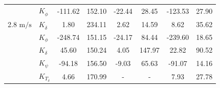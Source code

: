 \begin{table}[]
\begin{tabular}{llcccccc}
                                                   & $K_{\dot{\phi}} $                                      & -111.62                                     & 152.10                                               & -22.44                                      & 28.45                                                & -123.53                                     & 27.90                                                \\
    \multirow{-2}{*}{2.8 $\si{\meter\per\second}$} & $K_{\dot{\delta}}$                                     & 1.80                                        & 234.11                                               & 2.62                                        & 14.59                                                & 8.62                                        & 35.62                                                \\
                                                   & $K_{\phi} $                                            & -248.74                                     & 151.15                                               & -24.17                                      & 84.44                                                & -239.60                                     & 18.65                                                \\
                                                   & $K_\delta $                                            & 45.60                                       & 150.24                                               & 4.05                                        & 147.97                                               & 22.82                                       & 90.52                                                \\
                                                   & $K_\psi $                                              & -94.18                                      & 156.50                                               & -9.03                                       & 65.63                                                & -91.07                                      & 14.16                                                \\
                                                   & $K_{T_\delta}$                                         & 4.66                                        & 170.99                                               & -                                           & -                                                    & 7.93                                        & 27.78                                                \\ \cline{2-8} 

\end{tabular}
\end{table}
